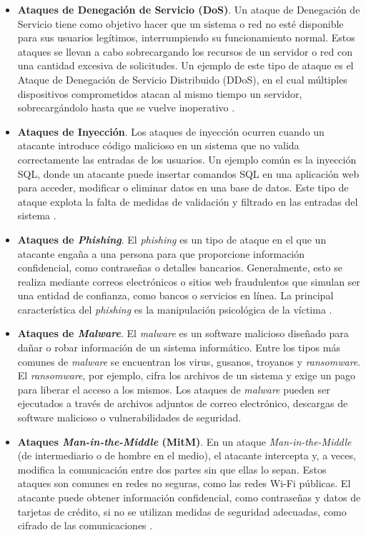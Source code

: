 \begin{itemize}

\item{\textbf{Ataques de Denegación de Servicio (DoS)}}.
Un ataque de Denegación de Servicio tiene como objetivo hacer que un sistema o red no esté disponible para sus usuarios legítimos, interrumpiendo su funcionamiento normal. Estos ataques se llevan a cabo sobrecargando los recursos de un servidor o red con una cantidad excesiva de solicitudes. Un ejemplo de este tipo de ataque es el Ataque de Denegación de Servicio Distribuido (DDoS), en el cual múltiples dispositivos comprometidos atacan al mismo tiempo un servidor, sobrecargándolo hasta que se vuelve inoperativo \cite{tanenbaum2009}.

\item{\textbf{Ataques de Inyección}}.
Los ataques de inyección ocurren cuando un atacante introduce código malicioso en un sistema que no valida correctamente las entradas de los usuarios. Un ejemplo común es la inyección SQL, donde un atacante puede insertar comandos SQL en una aplicación web para acceder, modificar o eliminar datos en una base de datos. Este tipo de ataque explota la falta de medidas de validación y filtrado en las entradas del sistema \cite{scott2015}.

\item{\textbf{Ataques de \textit{Phishing}}}.
El \textit{phishing} es un tipo de ataque en el que un atacante engaña a una persona para que proporcione información confidencial, como contraseñas o detalles bancarios. Generalmente, esto se realiza mediante correos electrónicos o sitios web fraudulentos que simulan ser una entidad de confianza, como bancos o servicios en línea. La principal característica del \textit{phishing} es la manipulación psicológica de la víctima \cite{cissp2018}.

\item{\textbf{Ataques de \textit{Malware}}}.
El \textit{malware} es un software malicioso diseñado para dañar o robar información de un sistema informático. Entre los tipos más comunes de \textit{malware} se encuentran los virus, gusanos, troyanos y \textit{ransomware}. El \textit{ransomware}, por ejemplo, cifra los archivos de un sistema y exige un pago para liberar el acceso a los mismos. Los ataques de \textit{malware} pueden ser ejecutados a través de archivos adjuntos de correo electrónico, descargas de software malicioso o vulnerabilidades de seguridad.

\item{\textbf{Ataques \textit{Man-in-the-Middle} (MitM)}}.
En un ataque \textit{Man-in-the-Middle} (de intermediario o de hombre en el medio), el atacante intercepta y, a veces, modifica la comunicación entre dos partes sin que ellas lo sepan. Estos ataques son comunes en redes no seguras, como las redes Wi-Fi públicas. El atacante puede obtener información confidencial, como contraseñas y datos de tarjetas de crédito, si no se utilizan medidas de seguridad adecuadas, como cifrado de las comunicaciones \cite{tanenbaum2009}.


\end{itemize}
